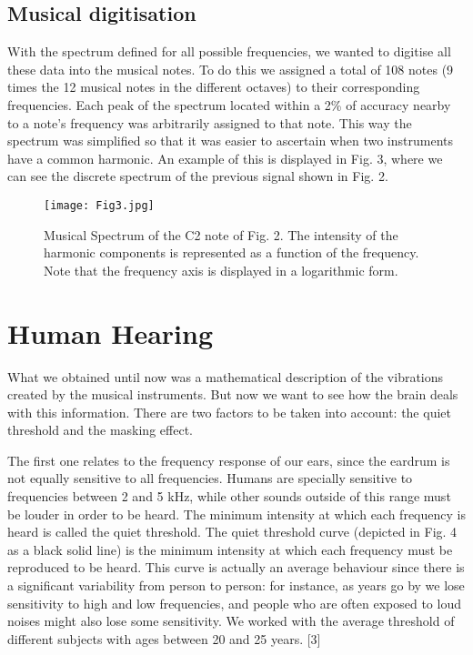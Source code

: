 \documentclass[twocolumn]{revtex4}
\begin{document}
\subsection{Musical digitisation}

With the spectrum defined for all possible frequencies, we wanted to digitise all these data into the musical notes. To do this we assigned a total of 108 notes (9 times the 12 musical notes in the different octaves) to their corresponding frequencies. Each peak of the spectrum located within a 2\% of accuracy nearby to a note's frequency was arbitrarily assigned to that note. This way the spectrum was simplified so that it was easier to ascertain when two instruments have a common harmonic. An example of this is displayed in Fig. 3, where we can see the discrete spectrum of the previous signal shown in Fig. 2.

\begin{figure}[h]
\centering
\texttt{[image: Fig3.jpg]}
\caption{Musical Spectrum of the C2 note of Fig. 2. The intensity of the harmonic components is represented as a function of the frequency. Note that the frequency axis is displayed in a logarithmic form.}
\end{figure}

\section{Human Hearing}

What we obtained until now was a mathematical description of the vibrations created by the musical instruments. But now we want to see how the brain deals with this information. There are two factors to be taken into account: the quiet threshold and the masking effect. 

The first one relates to the frequency response of our ears, since the eardrum is not equally sensitive to all frequencies. Humans are specially sensitive to frequencies between 2 and 5 kHz, while other sounds outside of this range must be louder in order to be heard. The minimum intensity at which each frequency is heard is called the quiet threshold. The quiet threshold curve (depicted in Fig. 4 as a black solid line) is the minimum intensity at which each frequency must be reproduced to be heard. This curve is actually an average behaviour since there is a significant variability from person to person: for instance, as years go by we lose sensitivity to high and low frequencies, and people who are often exposed to loud noises might also lose some sensitivity. We worked with the average threshold of different subjects with ages between 20 and 25 years. [3]
\end{document}
